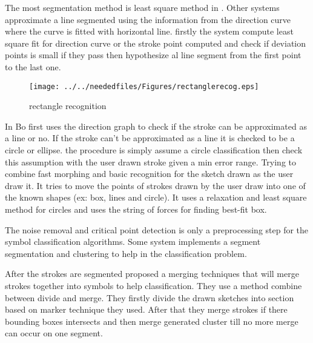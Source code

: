 The most segmentation method is least square method in \cite {overtraced24}. Other systems  approximate a line segmented using the information from the direction curve where the curve is fitted with horizontal line. firstly the system compute least square fit for direction curve or the stroke point computed and check if deviation points is small if they pass then hypothesize al line segment  from the first point to the last one. 

\begin{figure}
	\centering
		\texttt{[image: ../../neededfiles/Figures/rectanglerecog.eps]}
	\caption{rectangle recognition}
	\label{fig:rectanglerecog}
\end{figure}

 In \cite {meanshift10,domainindependent17}  Bo first uses the direction graph to check if the stroke can be approximated as a line or no. If the stroke can't be approximated as a line it is checked to be a circle or ellipse. the procedure is simply assume a circle classification then check this assumption with the user drawn stroke given a min error range.  
\cite {Fluid25} Trying to combine fast morphing and basic recognition for the sketch drawn as the user draw it. It tries to move the points of strokes drawn by the user draw into one of the known shapes (ex: box, lines and circle). It uses a relaxation and least square method for circles and uses the string of forces for finding best-fit box.

The noise removal and critical point detection is only a preprocessing step for the symbol classification algorithms. Some system implements a segment segmentation and clustering to help in the classification problem. 

After the strokes are segmented \cite {sketchunderstanding1,HierarchicalParsing7,Simusketch51}  proposed a merging techniques that will merge strokes together into symbols to help classification. They use a method combine between divide and merge. They firstly divide the drawn sketches into section based on marker technique they used. After that they merge strokes if there bounding boxes intersects and then  merge generated cluster till no more merge can occur on one segment.


%

